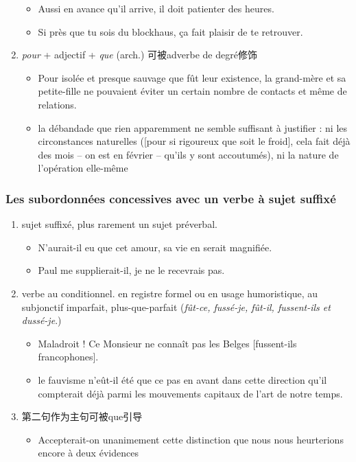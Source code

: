 \documentclass[UTF8]{report}
\begin{document}
\begin{enumerate}
\begin{itemize}
        \item Aussi en avance qu’il arrive, il doit patienter des heures.
        \item Si près que tu sois du blockhaus, ça fait plaisir de te retrouver. 
    \end{itemize}
    \item \textit{pour} + adjectif + \textit{que} (arch.) 可被adverbe de degré修饰
    \begin{itemize}
        \item Pour isolée et presque sauvage que fût leur existence, la grand-mère et sa petite-fille ne pouvaient éviter un certain nombre de contacts et même de relations. 
        \item la débandade que rien apparemment ne semble suffisant à justifier : ni les circonstances naturelles ([pour si rigoureux que soit le froid], cela fait déjà des mois – on est en février – qu’ils y sont accoutumés), ni la nature de l’opération elle-même
    \end{itemize}
\end{enumerate}


\subsubsection{Les subordonnées concessives avec un verbe à sujet suffixé}
\begin{enumerate}
    \item sujet suffixé, plus rarement un sujet préverbal. 
    \begin{itemize}
        \item N’aurait-il eu que cet amour, sa vie en serait magnifiée.
        \item Paul me supplierait-il, je ne le recevrais pas.
    \end{itemize}
    \item verbe au conditionnel. en registre formel ou en usage humoristique, au subjonctif imparfait, plus-que-parfait (\textit{fût-ce, fussé-je, fût-il, fussent-ils et dussé-je}.)
    \begin{itemize}
        \item Maladroit ! Ce Monsieur ne connaît pas les Belges [fussent-ils francophones]. 
        \item le fauvisme n’eût-il été que ce pas en avant dans cette direction qu’il compterait déjà parmi les mouvements capitaux de l’art de notre temps. 
    \end{itemize}
    \item 第二句作为主句可被que引导
    \begin{itemize}
        \item Accepterait-on unanimement cette distinction que nous nous heurterions encore à deux évidences
    \end{itemize}
\end{enumerate}
\end{document}
